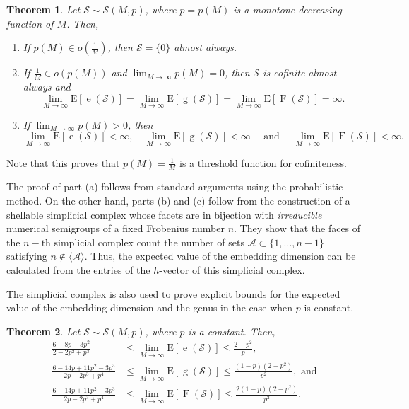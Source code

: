 \documentclass[11pt]{amsart}
\newtheorem{theorem}{Theorem}[section]
\theoremstyle{definition}
\theoremstyle{remark}
\def\cA{\ensuremath{\mathcal{A}}}
\def\EE{\ensuremath{\mathrm{E}}}
\def\nsg{\ensuremath{\mathcal{S}}}
\DeclareMathOperator\F{F}
\DeclareMathOperator\g{g}
\DeclareMathOperator\e{e}
\begin{document}
\begin{theorem} \cite{de2018random} Let $\nsg \sim \nsg(M, p)$, where $p = p(M)$ is a monotone decreasing function of $M$. Then, 
    \begin{enumerate}[label=(\alph*)]
        \item If $p(M) \in o\left(\frac{1}{M}\right)$, then $\nsg = \{0\}$ almost always.
        \item If $\frac{1}{M} \in o(p(M))$ and $\lim_{M \to \infty} p(M)= 0$, then $\nsg$ is cofinite almost always and
         \[\lim_{M \to  \infty} \EE[\e(\nsg)] = \lim_{M \to \infty} \EE[\g(\nsg)] = \lim_{M \to \infty} \EE[\F(\nsg)] = \infty.\]
        \item If $\lim_{M \to \infty} p(M) > 0$, then
        \[\lim_{M \to \infty} \EE[\e(\nsg)] < \infty,  \quad \lim_{M \to \infty} \EE[\g(\nsg)] < \infty \quad  \text{ and } \quad \lim_{M \to \infty} \EE[\F(\nsg)]< \infty .\]
    \end{enumerate}
\end{theorem}

Note that this proves that $p(M) = \frac{1}{M}$ is a threshold function for cofiniteness.

The proof of part (a) follows from standard arguments using the probabilistic method. On the other hand, parts (b) and (c) follow from the construction of a shellable simplicial complex whose facets are in bijection with \emph{irreducible} numerical semigroups of a fixed Frobenius number $n$. They show that the faces of the $n-$th simplicial complex count the number of sets $\cA \subset \{1, \ldots, n - 1\}$ satisfying $n \notin \langle\cA \rangle$. Thus, the expected value of the embedding dimension can be calculated from the entries of the $h$-vector of this simplicial complex. 

The simplicial complex is also used to prove explicit bounds for the expected value of the embedding dimension and the genus in the case when $p$ is constant.
\begin{theorem} \cite{de2018random} \label{thm:ermodel:constantp}
    Let $\nsg \sim \nsg(M, p)$, where $p$ is a constant. Then, 
    \begin{align*}
        \frac{6 - 8p + 3p^2}{2 - 2p^2 + p^3} &\leq \lim_{M \to \infty} \EE[\e(\nsg)] \leq \frac{2 - p^2}{p}, \\
        \frac{6 - 14p + 11p^2 - 3p^3}{2p - 2p^3 + p^4} &\leq \lim_{M \to \infty} \EE[\g(\nsg)] \leq \frac{(1 - p)(2 - p^2)}{p^2}, \text{ and}\\
        \frac{6 - 14p + 11p^2 - 3p^3}{2p - 2p^3 + p^4} &\leq \lim_{M \to \infty} \EE[\F(\nsg)] \leq \frac{2(1 - p)(2 - p^2)}{p^2}.
    \end{align*}
\end{theorem}
\end{document}
